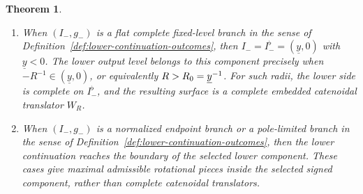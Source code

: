 \documentclass{amsart}
\theoremstyle{plain}
\newtheorem{theorem}{Theorem}[section]
\theoremstyle{mainintrothm}
\theoremstyle{definition}
\begin{document}
\begin{theorem}
\begin{enumerate}[label=\textup{(\roman*)}]
\begin{enumerate}[label=\textup{(\alph*)}]
			\item  When $(I_-,g_-)$ is a flat complete fixed-level branch in the sense of
			Definition~\ref{def:lower-continuation-outcomes}, then
			$I_-=I_-^\flat=(\underline y,0)$ with $\underline y<0$.  The lower
			output level belongs to this component precisely when $-R^{-1}\in(\underline y,0)$, or equivalently $R>R_0=\-\underline {y}^{-1}$. For such radii, the lower side is complete on $I_-^\flat$, and the
			resulting surface is a complete embedded catenoidal translator $W_R$.
			
			\item When $(I_-,g_-)$ is a normalized endpoint branch or a pole-limited
			branch in the sense of
			Definition~\ref{def:lower-continuation-outcomes}, then the lower
			continuation reaches the boundary of the selected lower component.
			These cases give maximal admissible rotational pieces inside the
			selected signed component, rather than complete catenoidal
			translators.
		\end{enumerate}
	\end{enumerate}
\end{theorem}
\end{document}
